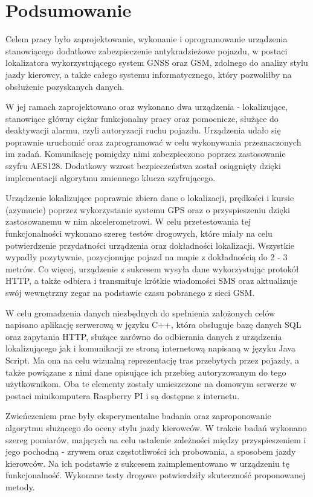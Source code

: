 \chapter{Podsumowanie}
\label{summary}

Celem pracy było zaprojektowanie, wykonanie i oprogramowanie urządzenia stanowiącego dodatkowe zabezpieczenie antykradzieżowe pojazdu, w postaci lokalizatora wykorzystującego system GNSS oraz GSM, zdolnego do analizy stylu jazdy kierowcy, a także całego systemu informatycznego, który pozwoliłby na obsłużenie pozyskanych danych.

W jej ramach zaprojektowano oraz wykonano dwa urządzenia - lokalizujące, stanowiące główny ciężar funkcjonalny pracy oraz pomocnicze, służące do deaktywacji alarmu, czyli autoryzacji ruchu pojazdu. Urządzenia udało się poprawnie uruchomić oraz zaprogramować w celu wykonywania przeznaczonych im zadań. Komunikację pomiędzy nimi zabezpieczono poprzez zastosowanie szyfru AES128. Dodatkowy wzrost bezpieczeństwa został osiągnięty dzięki implementacji algorytmu zmiennego klucza szyfrującego.

Urządzenie lokalizujące poprawnie zbiera dane o lokalizacji, prędkości i kursie (azymucie) poprzez wykorzystanie systemu GPS oraz o przyspieszeniu dzięki zastosowanemu w nim akcelerometrowi. W celu przetestowania tej funkcjonalności wykonano szereg testów drogowych, które miały na celu potwierdzenie przydatności urządzenia oraz dokładności lokalizacji. Wszystkie wypadły pozytywnie, pozycjonując pojazd na mapie z dokładnością do 2 - 3 metrów. Co więcej, urządzenie z sukcesem wysyła dane wykorzystując protokół HTTP, a także odbiera i transmituje krótkie wiadomości SMS oraz aktualizuje swój wewnętrzny zegar na podstawie czasu pobranego z sieci GSM.

W celu gromadzenia danych niezbędnych do spełnienia założonych celów napisano aplikację serwerową w języku C++, która obsługuje bazę danych SQL oraz zapytania HTTP, służące zarówno do odbierania danych z urządzenia lokalizującego jak i komunikacji ze stroną internetową napisaną w języku Java Script. Ma ona na celu wizualną reprezentację tras przebytych przez pojazdy, a także powiązane z nimi dane opisujące ich przebieg autoryzowanym do tego użytkownikom. Oba te elementy zostały umieszczone na domowym serwerze w postaci minikomputera Raspberry PI i są dostępne z internetu. 

Zwieńczeniem prac były eksperymentalne badania oraz zaproponowanie algorytmu służącego do oceny stylu jazdy kierowców. W trakcie badań wykonano szereg pomiarów, mających na celu ustalenie zależności między przyspieszeniem i jego pochodną - zrywem oraz częstotliwości ich probowania, a sposobem jazdy kierowców. Na ich podstawie z sukcesem zaimplementowano w urządzeniu tę funkcjonalność. Wykonane testy drogowe potwierdziły skuteczność proponowanej metody.

